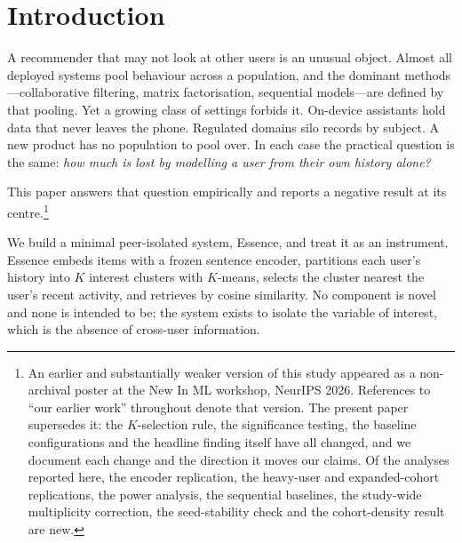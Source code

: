 \documentclass[runningheads]{llncs}
\begin{document}
\section{Introduction}

A recommender that may not look at other users is an unusual object. Almost all deployed
systems pool behaviour across a population, and the dominant methods---collaborative
filtering, matrix factorisation, sequential models---are defined by that pooling. Yet a
growing class of settings forbids it. On-device assistants hold data that never leaves the
phone. Regulated domains silo records by subject. A new product has no population to pool
over. In each case the practical question is the same: \emph{how much is lost by modelling
a user from their own history alone?}

This paper answers that question empirically and reports a negative result at its
centre.\footnote{An earlier and substantially weaker version of this study appeared as a
non-archival poster at the New In ML workshop, NeurIPS 2026. References to ``our earlier
work'' throughout denote that version. The present paper supersedes it: the $K$-selection
rule, the significance testing, the baseline configurations and the headline finding itself
have all changed, and we document each change and the direction it moves our claims. Of the
analyses reported here, the encoder replication, the heavy-user and expanded-cohort
replications, the power analysis, the sequential baselines, the study-wide multiplicity
correction, the seed-stability check and the cohort-density result are new.}

We build a minimal peer-isolated system, Essence, and treat it as an instrument. Essence
embeds items with a frozen sentence encoder, partitions each user's history into $K$
interest clusters with $K$-means, selects the cluster nearest the user's recent activity,
and retrieves by cosine similarity. No component is novel and none is intended to be; the
system exists to isolate the variable of interest, which is the absence of cross-user
information.
\end{document}
